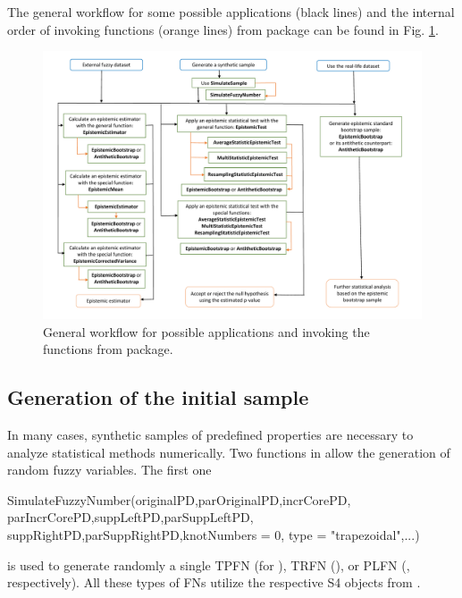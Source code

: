 The general workflow for some possible applications (black lines) and the internal order of invoking functions (orange lines) from  package can be found in Fig. \ref{figflowchart1}.



\begin{figure}[htb]
  \centering
	\includegraphics[scale=0.5]{flowchart3.pdf}
	\caption{General workflow for possible applications and invoking the functions from  package.}
	\label{figflowchart1}
\end{figure}







\subsection{Generation of the initial sample}
\label{genofinsa}

In many cases, synthetic samples of predefined properties are necessary to analyze statistical methods numerically.
Two functions in  allow the generation of random fuzzy variables.
The first one
\begin{example}
SimulateFuzzyNumber(originalPD,parOriginalPD,incrCorePD,
  parIncrCorePD,suppLeftPD,parSuppLeftPD,
  suppRightPD,parSuppRightPD,knotNumbers = 0,
  type = "trapezoidal",...)
\end{example}
is used to generate randomly a single TPFN (for ), TRFN (), or PLFN (, respectively).
All these types of FNs utilize the respective S4 objects from .


